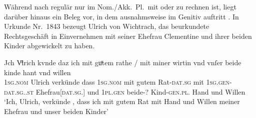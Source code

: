 

\label{phsec:beidegen}
Während nach \citet[623]{ksw2} regulär nur im Nom./Akk.~Pl.\ mit 
oder  zu rechnen ist, liegt darüber hinaus ein Beleg vor, in dem
 ausnahmsweise im Genitiv auftritt . In Urkunde
Nr.~1843 \autocite[146,11--47]{cao3} bezeugt Ulrich von Wichtrach, das
beurkundete Rechtsgeschäft in Einvernehmen mit seiner Ehefrau Clementine und
ihrer beiden Kinder abgewickelt zu haben.

\begin{exe}
\ex\label{ex:1843_kinde}
	\gll Jch Vͦlrich \textelp{} kvnde \textelp{} daz ich mit guͦtem rathe
			/ mit miner wirtin \textelp{} vnd vnſer beide kinde hant
			vnd willen \\
		\textsc{1sg\subM.nom} Ulrich {} verkünde {} dass \textsc{1sg\subM.nom} mit gutem
			Rat-\textsc{dat.sg} {} mit \textsc{1sg\subM.gen-dat.sg.\FemF.st}
			Ehefrau[\textsc{dat.sg.\FemF}] {} und \textsc{1pl\subMF.gen} beide-?
			Kind-\textsc{gen.pl.\NeutA} Hand und Willen \\
	\trans `Ich, Ulrich, \textelp{} verkünde \textelp{}, dass ich mit
		gutem Rat  mit Hand und Willen meiner Ehefrau \textelp{}
		und unser beiden Kinder'
		\parencites(Nr.~1843, Thun, Kt.~Bern, 1293)[146,11--13]{cao3}
\end{exe}

